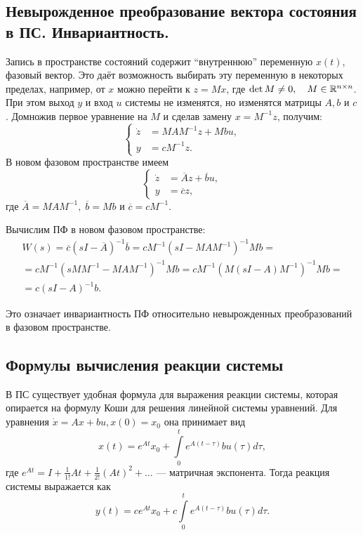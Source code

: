 \documentclass[../../TAU.tex]{subfiles}
\begin{document}
\subsection{Невырожденное преобразование вектора состояния в ПС. Инвариантность.}
    Запись в пространстве состояний содержит ``внутреннюю'' переменную $x(t)$, фазовый вектор. Это даёт возможность выбирать эту переменную в некоторых пределах, например, от $x$ можно перейти к $z=Mx$, где 
    $\det M \neq 0,\quad M\in\mathbb{R}^{n\times n}$. 
    При этом выход $y$ и вход $u$ системы не изменятся, но изменятся матрицы $A, b$ и $c$. Домножив первое уравнение на $M$ и сделав замену 
    $x=M^{-1}z$, 
    получим:
    $$
        \left\{
        \begin{aligned}
            \dot z &=M AM^{-1}z+Mbu,\\
            y&= cM^{-1}z.
        \end{aligned}
        \right.
    $$
    В новом фазовом пространстве имеем
    $$
        \left\{
        \begin{aligned}
            \dot z &= \overline{A}z+\overline{b}u,\\
            y&= \overline{c}z,
        \end{aligned}
        \right.
    $$
    где 
    $\overline{A} = M AM^{-1},\; \overline{b} = Mb$ 
    и 
    $\overline{c}= cM^{-1}$.

    Вычислим ПФ в новом фазовом пространстве:
    \begin{multline*}
        W(s) = \overline{c}(sI-\overline{A})^{-1}\overline{b} = cM^{-1}(sI-MAM^{-1})^{-1}Mb = \\
        = c M^{-1} (sMM^{-1} - MAM^{-1})^{-1}Mb = c M^{-1}(M(sI-A)M^{-1})^{-1}Mb = \\
        =c(sI-A)^{-1}b.
    \end{multline*}

    Это означает инвариантность ПФ относительно невырожденных преобразований в фазовом пространстве.

\subsection{Формулы вычисления реакции системы}

    В ПС существует удобная формула для выражения реакции системы, которая опирается на формулу Коши для решения линейной системы уравнений. Для уравнения 
    $\dot x = Ax + bu, x(0) = x_0$ 
    она принимает вид
    $$
        x(t) = e^{At}x_0 + \int\limits_{0}^{t} e^{A(t-\tau)}bu(\tau)d\tau,
    $$
    где 
    $e^{At} = I+\frac{1}{1!}At + \frac{1}{2!}(At)^{2} + \ldots$ --- 
    матричная экспонента.
    Тогда реакция системы выражается как
    $$
        y(t) = ce^{At}x_0 + c\int\limits_{0}^{t} e^{A(t-\tau)}bu(\tau)d\tau.
    $$
\end{document}
